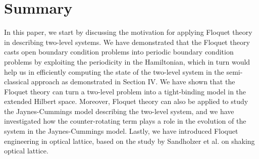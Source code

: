 \documentclass[reprint, amsmath, amssymb, aps]{revtex4-2}
\begin{document}
\section{Summary}
In this paper, we start by discussing the motivation for applying Floquet theory in describing two-level systems. We have demonstrated that the Floquet theory casts open boundary condition problems into periodic boundary condition problems by exploiting the periodicity in the Hamiltonian, which in turn would help us in efficiently computing the state of the two-level system in the semi-classical approach as demonstrated in Section IV. We have shown that the Floquet theory can turn a two-level problem into a tight-binding model in the extended Hilbert space. Moreover, Floquet theory can also be applied to study the Jaynes-Cummings model describing the two-level system, and we have investigated how the counter-rotating term plays a role in the evolution of the system in the Jaynes-Cummings model. Lastly, we have introduced Floquet engineering in optical lattice, based on the study by Sandholzer et al. on shaking optical lattice. \\


\end{document}
